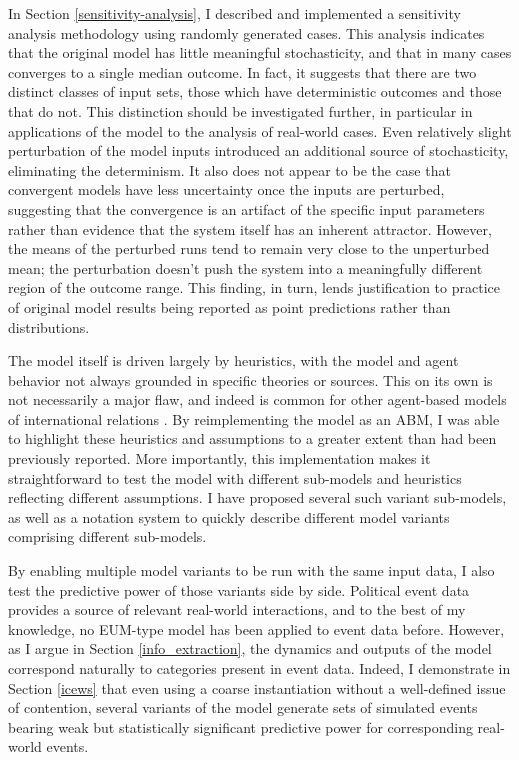 In Section \ref{sensitivity-analysis}, I described and implemented a sensitivity analysis methodology using randomly generated cases. This analysis indicates that the original model has little meaningful stochasticity, and that in many cases converges to a single median outcome. In fact, it suggests that there are two distinct classes of input sets, those which have deterministic outcomes and those that do not. This distinction should be investigated further, in particular in applications of the model to the analysis of real-world cases. Even relatively slight perturbation of the model inputs introduced an additional source of stochasticity, eliminating the determinism. It also does not appear to be the case that convergent models have less uncertainty once the inputs are perturbed, suggesting that the convergence is an artifact of the specific input parameters rather than evidence that the system itself has an inherent attractor. However, the means of the perturbed runs tend to remain very close to the unperturbed mean; the perturbation doesn't push the system into a meaningfully different region of the outcome range. This finding, in turn, lends justification to practice of original model results being reported as point predictions rather than distributions.

The model itself is driven largely by heuristics, with the model and agent behavior not always grounded in specific theories or sources. This on its own is not necessarily a major flaw, and indeed is common for other agent-based models of international relations \citep[e.g.][]{axelrod_1997,taylor_2008}. By reimplementing the model as an ABM, I was able to highlight these heuristics and assumptions to a greater extent than had been previously reported. More importantly, this implementation makes it straightforward to test the model with different sub-models and heuristics reflecting different assumptions. I have proposed several such variant sub-models, as well as a notation system to quickly describe different model variants comprising different sub-models.

By enabling multiple model variants to be run with the same input data, I also test the predictive power of those variants side by side. Political event data provides a source of relevant real-world interactions, and to the best of my knowledge, no EUM-type model has been applied to event data before. However, as I argue in Section \ref{info_extraction}, the dynamics and outputs of the model correspond naturally to categories present in event data. Indeed, I demonstrate in Section \ref{icews} that even using a coarse instantiation without a well-defined issue of contention, several variants of the model generate sets of simulated events bearing weak but statistically significant predictive power for corresponding real-world events. 

